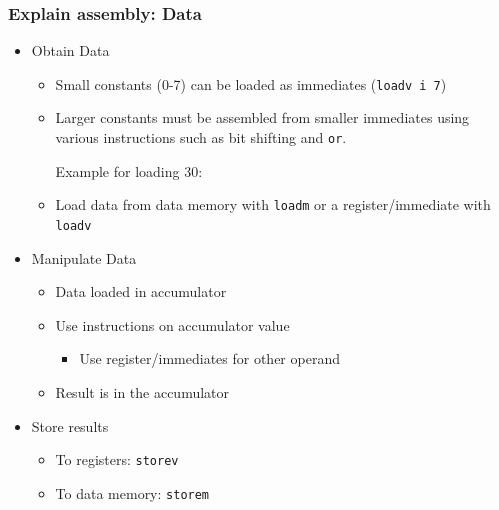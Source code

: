 	\begin{frame}
		\frametitle{Explain assembly: Data}

		\begin{itemize}
			\item Obtain Data
				\begin{itemize}
					\item Small constants (0-7) can be loaded as immediates (\texttt{loadv i 7})
					\item Larger constants must be assembled from smaller immediates using various instructions such as bit shifting and \texttt{or}.

						Example for loading $30$:
						\begin{quote}
						\end{quote}
					\item Load data from data memory with \texttt{loadm} or a register/immediate with \texttt{loadv}
				\end{itemize}
			\item Manipulate Data
				\begin{itemize}
					\item Data loaded in accumulator
					\item Use instructions on accumulator value
						\begin{itemize}
							\item Use register/immediates for other operand
						\end{itemize}
					\item Result is in the accumulator
				\end{itemize}
			\item Store results
				\begin{itemize}
					\item To registers: \texttt{storev}
					\item To data memory: \texttt{storem}
				\end{itemize}
		\end{itemize}
	\end{frame}

